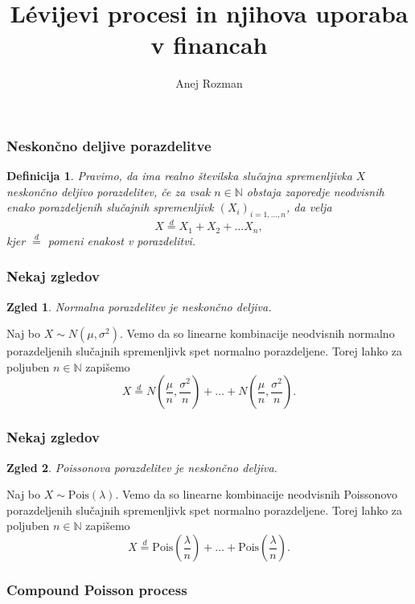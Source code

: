 \documentclass[]{beamer} %
\title{Lévijevi procesi in njihova uporaba v financah}
\subtitle{}
\author[Anej Rozman]{Anej Rozman}
\institute[]{Mentor: doc.~dr. Martin Raič}
\date[]{}
\theoremstyle{plain}
\newtheorem{definicija}{Definicija}
\newtheorem{zgled}{Zgled}
\begin{document}
\frame{\titlepage}


\begin{frame}
  \frametitle{Neskončno deljive porazdelitve}
  \begin{definicija}
    Pravimo, da ima realno številska slučajna spremenljivka $X$ \textit{neskončno deljivo porazdelitev}, če
    za vsak $n \in \mathbb{N}$ obstaja zaporedje neodvisnih enako porazdeljenih slučajnih spremenljivk $(X_i)_{i=1,\dots,n}$, 
    da velja 
    $$
    X \stackrel{d}{=} X_1 + X_2 + \dots X_n,
    $$
    kjer $\stackrel{d}{=}$ pomeni enakost v porazdelitvi.
\end{definicija}


  \end{frame}


\begin{frame}
  \frametitle{Nekaj zgledov}
  \begin{zgled}
    Normalna porazdelitev je neskončno deljiva.
  \end{zgled}
  \begin{center}
    Naj bo $X \sim N(\mu, \sigma^2)$. Vemo da so linearne kombinacije neodvisnih normalno 
    porazdeljenih slučajnih spremenljivk spet normalno porazdeljene. Torej lahko za poljuben 
    $n\in\mathbb{N}$ zapišemo
    $$
      X \stackrel{d}{=} N(\frac{\mu}{n}, \frac{\sigma^2}{n}) + \dots + N(\frac{\mu}{n}, \frac{\sigma^2}{n}).
    $$
  \end{center}
\end{frame}


\begin{frame}
  \frametitle{Nekaj zgledov}
  \begin{zgled}
    Poissonova porazdelitev je neskončno deljiva.
  \end{zgled}
  \begin{center}
    Naj bo $X \sim \text{Pois}(\lambda)$. Vemo da so linearne kombinacije neodvisnih Poissonovo
    porazdeljenih slučajnih spremenljivk spet normalno porazdeljene. Torej lahko za poljuben 
    $n\in\mathbb{N}$ zapišemo
    $$
      X \stackrel{d}{=} \text{Pois}(\frac{\lambda}{n}) + \dots + \text{Pois}(\frac{\lambda}{n}).
    $$
  \end{center}
\end{frame}

\begin{frame}
  \frametitle{Compound Poisson process}
\end{frame}
\end{document}
